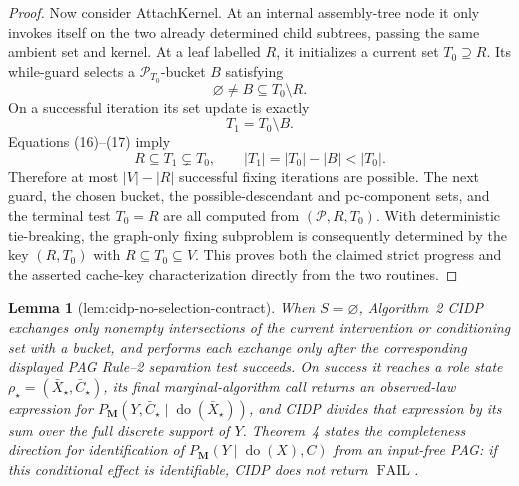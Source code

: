 \documentclass{article}
\newtheorem{lemma}{Lemma}
\begin{document}
\begin{proof}
Now consider AttachKernel.  At an internal assembly-tree node it only invokes
itself on the two already determined child subtrees, passing the same ambient
set and kernel.  At a leaf labelled \(R\), it initializes a current set
\(T_0\supseteq R\).  Its while-guard selects a
\(\mathcal P_{T_0}\)-bucket \(B\) satisfying
\[
 \varnothing\ne B\subseteq T_0\setminus R.
 \tag{16}
\]
On a successful iteration its set update is exactly
\[
 T_1=T_0\setminus B.
 \tag{17}
\]
Equations (16)--(17) imply
\[
 R\subseteq T_1\subsetneq T_0,
 \qquad |T_1|=|T_0|-|B|<|T_0|.
 \tag{18}
\]
Therefore at most \(|V|-|R|\) successful fixing iterations are possible.
The next guard, the chosen bucket, the possible-descendant and pc-component
sets, and the terminal test \(T_0=R\) are all computed from
\((\mathcal P,R,T_0)\).  With deterministic tie-breaking, the graph-only
fixing subproblem is consequently determined by the key
\((R,T_0)\) with \(R\subseteq T_0\subseteq V\).  This proves both the claimed
strict progress and the asserted cache-key characterization directly from the
two routines.
\end{proof}

\begin{lemma}[lem:cidp-no-selection-contract]\label{lem:cidp-no-selection-contract}
When \(S=\varnothing\), Algorithm~2 CIDP exchanges only nonempty intersections of the current intervention or conditioning set with a bucket, and performs each exchange only after the corresponding displayed PAG Rule--2 separation test succeeds.  On success it reaches a role state \(\rho_\star=(\bar X_\star,\bar C_\star)\), its final marginal-algorithm call returns an observed-law expression for \(P_{\mathbf M}(Y,\bar C_\star\mid\operatorname{do}(\bar X_\star))\), and CIDP divides that expression by its sum over the full discrete support of \(Y\).  Theorem~4 states the completeness direction for identification of \(P_{\mathbf M}(Y\mid\operatorname{do}(X),C)\) from an input-free PAG: if this conditional effect is identifiable, CIDP does not return \(\operatorname{FAIL}\).
\end{lemma}
\end{document}
